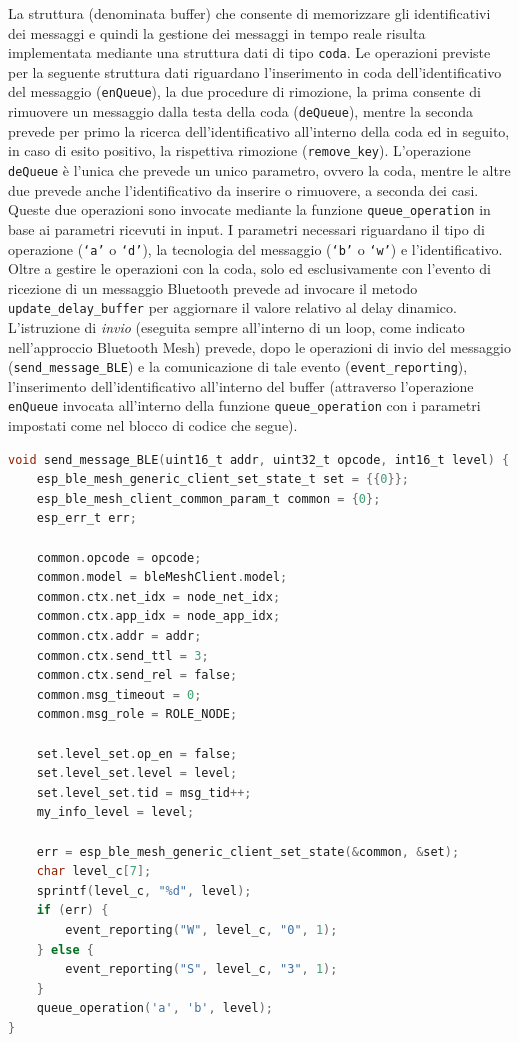 \noindent La struttura (denominata buffer) che consente di memorizzare gli identificativi dei messaggi e quindi la gestione dei messaggi in tempo reale risulta implementata mediante una struttura dati di tipo \texttt{coda}. Le operazioni previste per la seguente struttura dati riguardano l'inserimento in coda dell'identificativo del messaggio (\texttt{enQueue}), la due procedure di rimozione, la prima consente di rimuovere un messaggio dalla testa della coda (\texttt{deQueue}), mentre la seconda prevede per primo la ricerca dell'identificativo all'interno della coda ed in seguito, in caso di esito positivo, la rispettiva rimozione (\texttt{remove\_key}). L'operazione \texttt{deQueue} è l'unica che prevede un unico parametro, ovvero la coda, mentre le altre due prevede anche l'identificativo da inserire o rimuovere, a seconda dei casi. Queste due operazioni sono invocate mediante la funzione \texttt{queue\_operation} in base ai parametri ricevuti in input. I parametri necessari riguardano il tipo di operazione (\texttt{`a'} o \texttt{`d'}), la tecnologia del messaggio (\texttt{`b'} o \texttt{`w'}) e l'identificativo. Oltre a gestire le operazioni con la coda, solo ed esclusivamente con l'evento di ricezione di un messaggio Bluetooth prevede ad invocare il metodo \texttt{update\_delay\_buffer} per aggiornare il valore relativo al delay dinamico.\\

\noindent L'istruzione di \textit{invio} (eseguita sempre all'interno di un loop, come indicato nell'approccio Bluetooth Mesh) prevede, dopo le operazioni di invio del messaggio (\texttt{send\_message\_BLE}) e la comunicazione di tale evento (\texttt{event\_reporting}), l'inserimento dell'identificativo all'interno del buffer (attraverso l'operazione \texttt{enQueue} invocata all'interno della funzione \texttt{queue\_operation} con i parametri impostati come nel blocco di codice che segue). 

\begin{lstlisting}[language=C, caption= evento d'invio con rispettiva segnalazione e utilizzo della coda]
void send_message_BLE(uint16_t addr, uint32_t opcode, int16_t level) {
    esp_ble_mesh_generic_client_set_state_t set = {{0}};
    esp_ble_mesh_client_common_param_t common = {0};
    esp_err_t err;

    common.opcode = opcode;
    common.model = bleMeshClient.model;
    common.ctx.net_idx = node_net_idx;
    common.ctx.app_idx = node_app_idx;
    common.ctx.addr = addr;
    common.ctx.send_ttl = 3;
    common.ctx.send_rel = false;
    common.msg_timeout = 0;
    common.msg_role = ROLE_NODE;

    set.level_set.op_en = false;
    set.level_set.level = level;
    set.level_set.tid = msg_tid++;
    my_info_level = level;

    err = esp_ble_mesh_generic_client_set_state(&common, &set);
    char level_c[7];
    sprintf(level_c, "%d", level);    
    if (err) {
        event_reporting("W", level_c, "0", 1);
    } else {
        event_reporting("S", level_c, "3", 1);
    }
    queue_operation('a', 'b', level);
}
\end{lstlisting}

